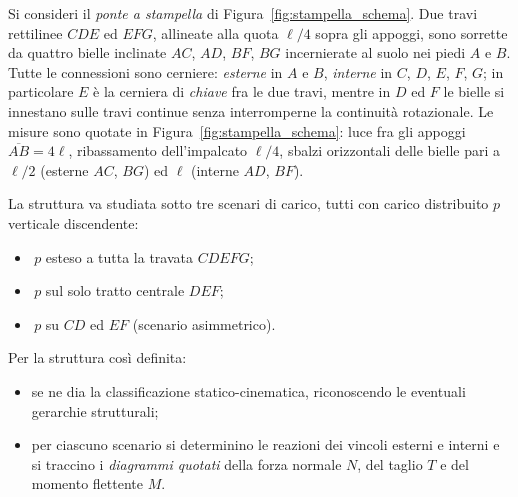 \begin{esercizio}
	\label{ex:ponte_stampella}
	
	Si consideri il \emph{ponte a stampella} di
	Figura~\ref{fig:stampella_schema}. Due travi rettilinee $CDE$ ed $EFG$,
	allineate alla quota $\ell/4$ sopra gli appoggi, sono sorrette da quattro
	bielle inclinate $AC$, $AD$, $BF$, $BG$ incernierate al suolo nei piedi
	$A$ e $B$. Tutte le connessioni sono cerniere: \emph{esterne} in $A$ e
	$B$, \emph{interne} in $C$, $D$, $E$, $F$, $G$; in particolare $E$ è la
	cerniera di \emph{chiave} fra le due travi, mentre in $D$ ed $F$ le
	bielle si innestano sulle travi continue senza interromperne la
	continuità rotazionale. Le misure sono quotate in Figura~\ref{fig:stampella_schema}: luce fra gli appoggi $\overline{AB}=4\ell$, ribassamento dell'impalcato $\ell/4$, sbalzi orizzontali delle bielle pari a $\ell/2$ (esterne $AC$, $BG$) ed $\ell$ (interne $AD$, $BF$).
	
	La struttura va studiata sotto tre scenari di carico, tutti con carico
	distribuito $p$ verticale discendente:
	\begin{itemize}
		\item[(a)] \,$p$ esteso a tutta la travata $CDEFG$;
		\item[(b)] \,$p$ sul solo tratto centrale $DEF$;
		\item[(c)] \,$p$ su $CD$ ed $EF$ (scenario asimmetrico).
	\end{itemize}
	Per la struttura così definita:
	\begin{itemize}
		\item[1)] se ne dia la classificazione statico-cinematica,
		riconoscendo le eventuali gerarchie strutturali;
		\item[2)] per ciascuno scenario si determinino le reazioni dei
		vincoli esterni e interni e si traccino i \textit{diagrammi quotati}
		della forza normale $N$, del taglio $T$ e del momento flettente $M$.
	\end{itemize}
	




	

\end{esercizio}
